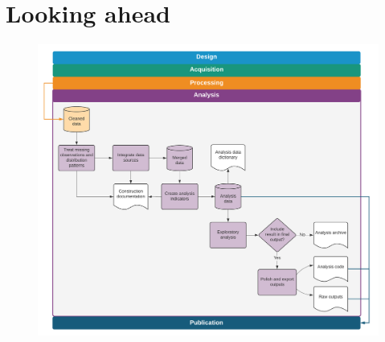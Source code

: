 \section{Looking ahead}

\begin{fullwidth}
	\begin{figure}
		\centering
		\includegraphics[width=1.6\linewidth]{diagrams/Analysis}
		\label{fig:analysis}
	\end{figure}
\end{fullwidth}

